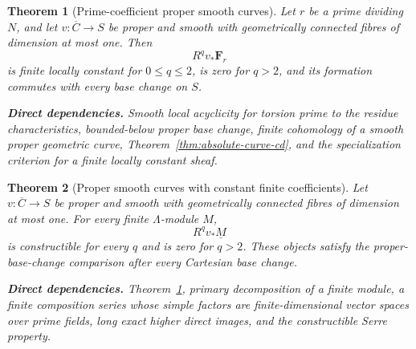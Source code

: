 \documentclass[10pt]{article}
\newtheorem{theorem}{Theorem}[section]
\theoremstyle{definition}
\newcommand{\deps}[1]{\par\smallskip\noindent\textbf{Direct dependencies.} #1}
\begin{document}
\begin{theorem}[Prime-coefficient proper smooth curves]
\label{thm:prime-smooth-proper-curve}
Let $r$ be a prime dividing $N$, and let
$v:\overline C\to S$ be proper and smooth with geometrically connected
fibres of dimension at most one.  Then
\[
 R^qv_*\mathbf F_r
\]
is finite locally constant for $0\leq q\leq2$, is zero for $q>2$, and its
formation commutes with every base change on $S$.
\deps{Smooth local acyclicity for torsion prime to the residue
characteristics, bounded-below proper base change, finite cohomology of a
smooth proper geometric curve, Theorem~\ref{thm:absolute-curve-cd}, and the
specialization criterion for a finite locally constant sheaf.}
\end{theorem}

\begin{theorem}[Proper smooth curves with constant finite coefficients]
\label{thm:smooth-proper-curve}
Let $v:\overline C\to S$ be proper and smooth with geometrically connected
fibres of dimension at most one.  For every finite $\Lambda$-module $M$,
\[
 R^qv_*\underline M
\]
is constructible for every $q$ and is zero for $q>2$.  These objects satisfy
the proper-base-change comparison after every Cartesian base change.
\deps{Theorem~\ref{thm:prime-smooth-proper-curve}, primary decomposition of
a finite module, a finite composition series whose simple factors are
finite-dimensional vector spaces over prime fields, long exact higher direct
images, and the constructible Serre property.}
\end{theorem}
\end{document}
